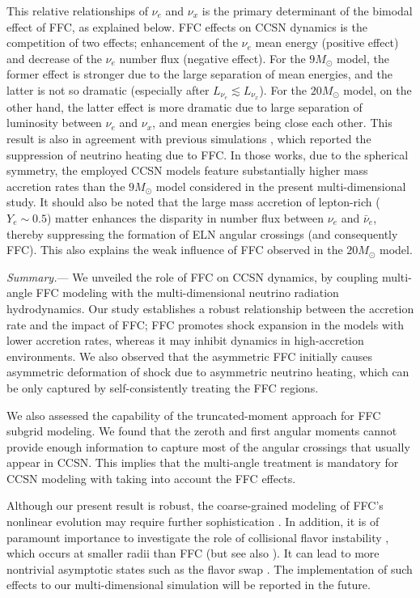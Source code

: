 \documentclass[
reprint,
superscriptaddress,
amsmath,amssymb,
aps,
prl
]{revtex4-2}
\begin{document}
This relative relationships of $\nu_e$ and $\nu_x$ is the primary determinant of the bimodal effect of FFC, as explained below.
FFC effects on CCSN dynamics is the competition of two effects; enhancement of the $\nu_e$ mean energy (positive effect) and decrease of the $\nu_e$ number flux (negative effect).
For the $9M_\odot$ model, the former effect is stronger due to the large separation of mean energies, and the latter is not so dramatic (especially after $L_{\nu_e}\lesssim L_{\nu_x}$).
For the $20M_\odot$ model, on the other hand, the latter effect is more dramatic due to large separation of luminosity between $\nu_e$ and $\nu_x$, and mean energies being close each other.
This result is also in agreement with previous simulations \cite{Nagakura2023PhRvL.130u1401N,Xiong2025PhRvL.134e1003X,Akaho2025PhRvD.112d3015A}, which reported the suppression of neutrino heating due to FFC. In those works, due to the spherical symmetry, the employed CCSN models feature substantially higher mass accretion rates than the $9M_\odot$ model considered in the present multi-dimensional study.
It should also be noted that the large mass accretion of lepton-rich ($Y_e \sim 0.5$) matter enhances the disparity in number flux between $\nu_e$ and $\bar{\nu}_e$, thereby suppressing the formation of ELN angular crossings (and consequently FFC). This also explains the weak influence of FFC observed in the $20M_\odot$ model.

{\em Summary.}---
We unveiled the role of FFC on CCSN dynamics, by coupling multi-angle FFC modeling with the multi-dimensional neutrino radiation hydrodynamics.
Our study establishes a robust relationship between the accretion rate and the impact of FFC; FFC promotes shock expansion in the models with lower accretion rates, whereas it may inhibit dynamics in high-accretion environments.
We also observed that the asymmetric FFC initially causes asymmetric deformation of shock due to asymmetric neutrino heating, which can be only captured by self-consistently treating the FFC regions.

We also assessed the capability of the truncated-moment approach for FFC subgrid modeling. We found that the zeroth and first angular moments cannot provide enough information to capture most of the angular crossings that usually appear in CCSN. This implies that the multi-angle treatment is mandatory for CCSN modeling with taking into account the FFC effects.

Although our present result is robust, the coarse-grained modeling of FFC’s nonlinear evolution may require further sophistication \cite{Fiorillo2024PhRvL.133v1004F,Urquilla2025arXiv251023917U,Liu2025PhRvD.111b3051L}.
In addition, it is of paramount importance to investigate the role of collisional flavor instability \cite{Johns2023PhRvL.130s1001J}, which occurs at smaller radii than FFC \cite{Akaho2024PhRvD.109b3012A} (but see also \cite{Wang2025PhRvD.112f3039W}).
It can lead to more nontrivial asymptotic states such as the flavor swap \cite{Kato2024PhRvD.109j3009K}.
The implementation of such effects to our multi-dimensional simulation will be reported in the future.
\end{document}
